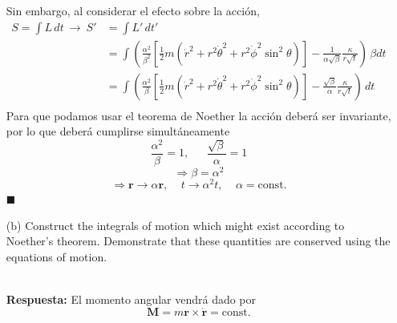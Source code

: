 \documentclass[]{article}
\numberwithin{equation}{section}
\newcommand{\0}{\textcolor{gray}{0}}
\newcommand{\rv}{\mathbf{r}}
\newcommand{\n}[1]{\mathbf{#1}}
\newcommand{\qed}{\hfill\(\blacksquare\)}
\newcommand{\resp}{
	\\
	
	\textbf{Respuesta:} }
\begin{document}
\begin{enumerate}
	Sin embargo, al considerar el efecto sobre la acción,
	\begin{align*}
		S = \int L \, dt ~\rightarrow~ S' &= \int L' \, dt' \\
		&= \int \left(\frac{\alpha^2}{\beta^2} \left[\frac{1}{2}m \left(\dot{r}^2 + r^2 \dot{\theta}^2 + r^2\dot{\phi}^2 \sin^2 \theta \right)\right] - \frac{1}{\alpha \sqrt{\beta}} \frac{\kappa}{r \sqrt{t}}\right) \, \beta dt\\
		&= \int \left(\frac{\alpha^2}{\beta} \left[\frac{1}{2}m \left(\dot{r}^2 + r^2 \dot{\theta}^2 + r^2\dot{\phi}^2 \sin^2 \theta \right)\right] - \frac{\sqrt{\beta}}{\alpha} \frac{\kappa}{r \sqrt{t}}\right) \, dt\\
	\end{align*}
	Para que podamos usar el teorema de Noether la acción deberá ser invariante, por lo que deberá cumplirse simultáneamente
	\begin{equation*}
		\frac{\alpha^2}{\beta} = 1, ~~~~~~~ \frac{\sqrt{\beta}}{\alpha} = 1
	\end{equation*}
	\begin{equation*}
		\Rightarrow \beta = \alpha^2
	\end{equation*}
	\begin{equation*}
		\Rightarrow \rv \rightarrow \alpha \rv, ~~~~~ t\rightarrow \alpha^2 t, ~~~~~ \alpha = \mathrm{const.}
	\end{equation*}
	\qed
	
	\item[(b)] Construct the integrals of motion which might exist according to Noether’s theorem. Demonstrate that these quantities are conserved using the equations of motion.
	\resp El momento angular vendrá dado por
	\begin{equation}
		\n{M} = m\rv\times\dot{\rv} = \mathrm{const.}
	\end{equation}
	

\end{enumerate}
\end{document}
